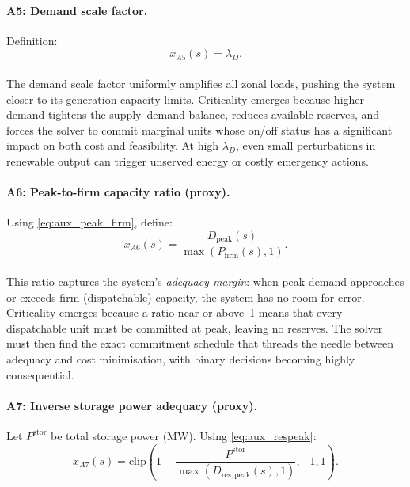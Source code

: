 \documentclass{article}
\begin{document}
\paragraph{A5: Demand scale factor.}
Definition:
\begin{equation}
x_{A5}(s)=\lambda_D.
\end{equation}

\paragraph{}The demand scale factor uniformly amplifies all zonal loads, pushing the system closer to its generation capacity limits. Criticality emerges because higher demand tightens the supply--demand balance, reduces available reserves, and forces the solver to commit marginal units whose on/off status has a significant impact on both cost and feasibility. At high $\lambda_D$, even small perturbations in renewable output can trigger unserved energy or costly emergency actions.

\paragraph{A6: Peak-to-firm capacity ratio (proxy).}
Using \eqref{eq:aux_peak_firm}, define:
\begin{equation}
x_{A6}(s)=\frac{D_{\mathrm{peak}}(s)}{\max\!\left(P_{\mathrm{firm}}(s),1\right)}.
\end{equation}

\paragraph{}This ratio captures the system's \emph{adequacy margin}: when peak demand approaches or exceeds firm (dispatchable) capacity, the system has no room for error. Criticality emerges because a ratio near or above~1 means that every dispatchable unit must be committed at peak, leaving no reserves. The solver must then find the exact commitment schedule that threads the needle between adequacy and cost minimisation, with binary decisions becoming highly consequential.

\paragraph{A7: Inverse storage power adequacy (proxy).}
Let $P^{\mathrm{stor}}$ be total storage power (MW). Using \eqref{eq:aux_respeak}:
\begin{equation}
x_{A7}(s)=\mathrm{clip}\!\left(1-\frac{P^{\mathrm{stor}}}{\max\!\left(D_{\mathrm{res,peak}}(s),1\right)},-1,1\right).
\end{equation}
\end{document}
